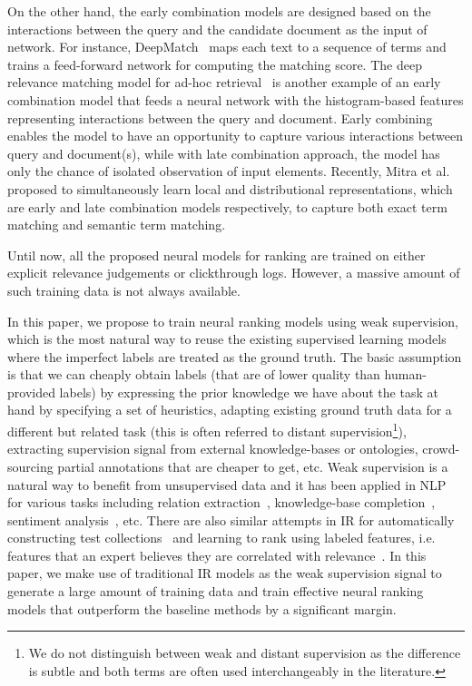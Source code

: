 \documentclass[sigconf]{acmart}
\begin{document}
On the other hand, the early combination models are designed based on the interactions between the query and the candidate document as the input of network. 
For instance, DeepMatch~\citep{Lu:2013} maps each text to a sequence of terms and trains a feed-forward network for computing the matching score. 
The deep relevance matching model for ad-hoc retrieval~\citep{Guo:2016} is another example of an early combination model that feeds a neural network with the  histogram-based features representing interactions between the query and document. 
Early combining enables the model to have an opportunity to capture various interactions between query and document(s), while with late combination approach, the model has only the chance of isolated observation of input elements. Recently, Mitra et al.~\citep{Mitra:2016} proposed to simultaneously learn local and distributional representations, which are early and late combination models respectively,  to capture both exact term matching and semantic term matching.

Until now, all the proposed neural models for ranking are trained on either explicit relevance judgements or clickthrough logs. However, a massive amount of such training data is not always available. 

In this paper, we propose to train neural ranking models using weak supervision, which is the most natural way to reuse the existing supervised learning models where the imperfect labels are treated as the ground truth.
The basic assumption is that we can cheaply obtain labels (that are of lower quality than human-provided labels) by expressing the prior knowledge we have about the task at hand by specifying a set of heuristics, adapting existing ground truth data for a different but related task (this is often referred to distant supervision\footnote{We do not distinguish between weak and distant supervision as the difference is subtle and both terms are often used interchangeably in the literature.}), extracting supervision signal from external knowledge-bases or ontologies, crowd-sourcing partial annotations that are cheaper to get, etc.
%
Weak supervision is a natural way to benefit from unsupervised data and it has been applied in NLP for various tasks including relation extraction~\citep{Bing:2015,Han:2016}, knowledge-base completion~\citep{Hoffmann:2011}, sentiment analysis~\citep{Severyn:2015}, etc.  
There are also similar attempts in IR for automatically constructing test collections~\citep{Asadi:2011} and learning to rank using labeled features, i.e. features that an expert believes they are correlated with relevance~\citep{Diaz:2016:ictir}.
In this paper, we make use of traditional IR models as the weak supervision signal to generate a large amount of training data and train effective neural ranking models that outperform the baseline methods by a significant margin.
\end{document}
